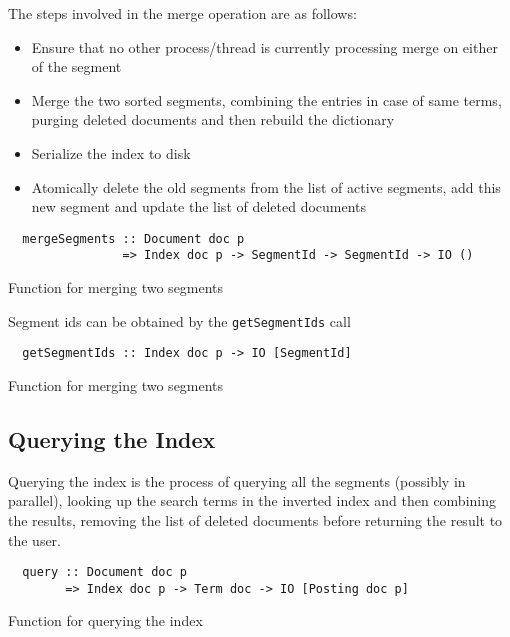 The steps involved in the merge operation are as follows:
\begin{itemize}
\item Ensure that no other process/thread is currently processing merge on either of the segment
\item Merge the two sorted segments, combining the entries in case of same terms, purging deleted documents and then rebuild the dictionary
\item Serialize the index to disk
\item Atomically delete the old segments from the list of active segments, add this new segment and update the list of deleted documents
\end{itemize}

\begin{listing}
\begin{verbatim}
  mergeSegments :: Document doc p
                => Index doc p -> SegmentId -> SegmentId -> IO ()
\end{verbatim}
\caption{Function for merging two segments}
\end{listing}

Segment ids can be obtained by the \texttt{getSegmentIds} call

\begin{listing}
\begin{verbatim}
  getSegmentIds :: Index doc p -> IO [SegmentId]
\end{verbatim}
\caption{Function for merging two segments}
\end{listing}

\clearpage

\subsection{Querying the Index}
Querying the index is the process of querying all the segments (possibly in parallel), looking up the search terms in the inverted index and then
combining the results, removing the list of deleted documents before returning the result to the user.

\begin{listing}
\begin{verbatim}
  query :: Document doc p
        => Index doc p -> Term doc -> IO [Posting doc p]
\end{verbatim}
\caption{Function for querying the index}
\end{listing}

